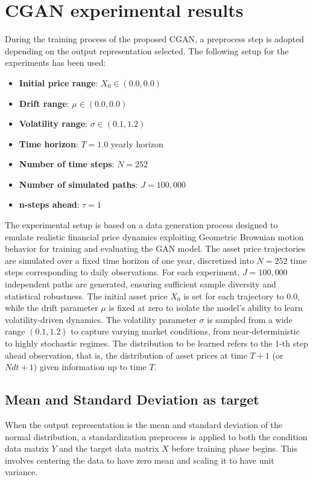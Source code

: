 \chapter{CGAN experimental results}

During the training process of the proposed CGAN, a preprocess step is adopted 
depending on the output representation selected. The following setup for the experiments has been used:\\
\begin{itemize}
    \item \textbf{Initial price range}: $X_0 \in (0.0, 0.0)$
    \item \textbf{Drift range}: $\mu \in (0.0, 0.0)$
    \item \textbf{Volatility range}: $\sigma \in (0.1, 1.2)$
    \item \textbf{Time horizon}: $T = 1.0 $ yearly horizon
    \item \textbf{Number of time steps}: $N = 252$
    \item \textbf{Number of simulated paths}: $J = 100{,}000$
    \item \textbf{n-steps ahead}: $\tau = 1$
\end{itemize}

The experimental setup is based on a data generation process designed to emulate realistic financial price dynamics exploiting Geometric Brownian motion behavior
for training and evaluating the GAN model. 
The asset price trajectories are simulated over a fixed time horizon of one year, discretized into $N=252$ time steps corresponding to daily observations.
For each experiment, $J=100{,}000$ independent paths are generated, ensuring sufficient sample diversity and statistical robustness.
The initial asset price $X_0$ is set for each trajectory to $0.0$, while the drift parameter $\mu$ is fixed at zero to isolate the model's ability to learn volatility-driven dynamics.
The volatility parameter $\sigma$ is sampled from a wide range $(0.1, 1.2)$ to capture varying market conditions, from near-deterministic to highly stochastic regimes.
The distribution to be learned refers to the $1$-th step ahead observation, that is, the distribution of asset prices at time $T + 1$ (or $N dt + 1$) given information up to time $T$.


\section{Mean and Standard Deviation as target}
When the output representation is the mean and standard deviation of the normal distribution,
a standardization preprocess is applied to both the condition data matrix $Y$ and the target data matrix $X$ before training phase begins.
This involves centering the data to have zero mean and scaling it to have unit variance.\\


